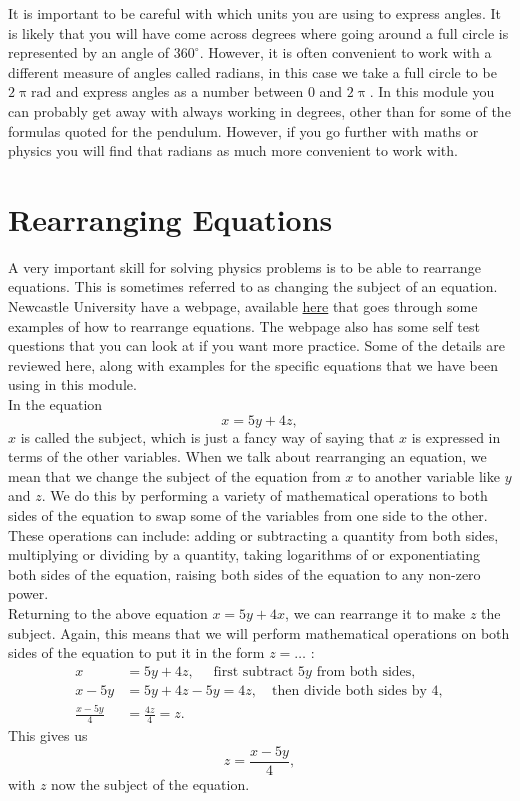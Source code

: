 It is important to be careful with which units you are using to express angles. It is likely that you will have come across degrees where going around a full circle is represented by an angle of $360^{\circ}$. However, it is often convenient to work with a different measure of angles called radians, in this case we take a full circle to be $2\uppi\text{rad}$ and express angles as a number between $0$ and $2\uppi$. In this module you can probably get away with always working in degrees, other than for some of the formulas quoted for the pendulum. However, if you go further with maths or physics you will find that radians as much more convenient to work with.

\section{Rearranging Equations}
A very important skill for solving physics problems is to be able to rearrange equations. This is sometimes referred to as changing the subject of an equation. Newcastle University have a webpage, available \href{https://www.mas.ncl.ac.uk/ask/numeracy-maths-statistics/core-mathematics/pure-maths/algebra/rearranging-equations.html}{here} that goes through some examples of how to rearrange equations. The webpage also has some self test questions that you can look at if you want more practice. Some of the details are reviewed here, along with examples for the specific equations that we have been using in this module.\\


In the equation
\begin{equation*}
x=5y+4z,
\end{equation*}
$x$ is called the subject, which is just a fancy way of saying that $x$ is expressed in terms of the other variables. When we talk about rearranging an equation, we mean that we change the subject of the equation from $x$ to another variable like $y$ and $z$. We do this by performing a variety of mathematical operations to both sides of the equation to swap some of the variables from one side to the other. \\

These operations can include: adding or subtracting a quantity from both sides, multiplying or dividing by a quantity, taking logarithms of or exponentiating both sides of the equation, raising both sides of the equation to any non-zero power.\\

Returning to the above equation $x=5y+4x$, we can rearrange it to make $z$ the subject. Again, this means that we will perform mathematical operations on both sides of the equation to put it in the form $z=\dots{}$ : 
\begin{align*}
x&=5y+4z, \quad \text{ first subtract $5y$ from both sides},\\
x-5y&=5y+4z-5y=4z, \quad \text{then divide both sides by 4},\\
\frac{x-5y}{4}&=\frac{4z}{4}=z.
\end{align*}
This gives us
\begin{equation*}
z=\frac{x-5y}{4},
\end{equation*}
with $z$ now the subject of the equation.\\


